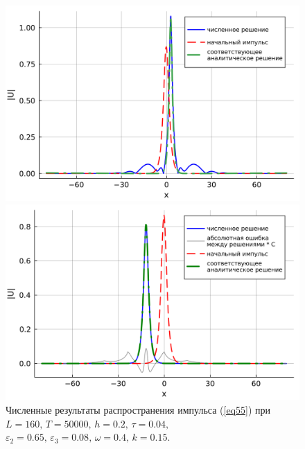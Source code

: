 \documentclass[14pt,a4paper]{extreport}
\begin{document}
			\begin{figure}[H] %
				\begin{center}
					\begin{minipage}[h]{0.48\linewidth}
						\includegraphics[width=1\linewidth]{fig67.png}
					\end{minipage}
					\hfill
					\begin{minipage}[h]{0.48\linewidth}
						\includegraphics[width=1\linewidth]{fig68.png}
					\end{minipage}
				\end{center}
				\caption{Численные результаты распространения импульса (\ref{eq55}) при
				\(L=160,\, T=50000,\, h=0.2,\, \tau=0.04,\)
				\(\varepsilon_{2}=0.65,\,\varepsilon_{3}=0.08,\, \omega=0.4,\, k=0.15\).}
				\label{fig340-6}
			\end{figure}
\end{document}
